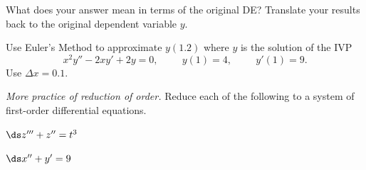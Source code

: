  \item  What does your answer mean in terms of the original DE?  Translate your results
  back to the original dependent variable $y$.\\ \vspace{2cm}
 \een

\newpage
\item  Use Euler's Method to approximate $y(1.2)$ where $y$ is the solution of the IVP
 \[ x^2 y'' - 2xy' + 2y = 0, \hspace{1cm} y(1) = 4, \hspace{1cm} y'(1) = 9. \]
 Use $\Delta x = 0.1.$

\newpage
\item  {\it More practice of reduction of order.}  Reduce each of the following
 to a system of first-order differential equations.
 \ben
 \item  $\ds z''' + z'' = t^3$\\ \vfill

 \item  $\ds x'' + y' = 9$\\

